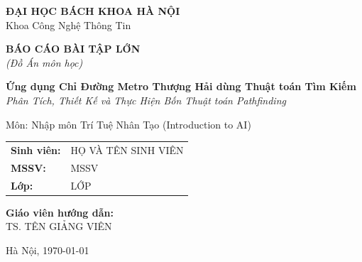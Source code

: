 
\newcommand{\svname}{HỌ VÀ TÊN SINH VIÊN}
\newcommand{\svid}{MSSV}
\newcommand{\svclass}{LỚP}
\newcommand{\gvname}{TS. TÊN GIẢNG VIÊN}
\newcommand{\reporttitle}{Ứng dụng Chỉ Đường Metro Thượng Hải dùng Thuật toán Tìm Kiếm}
\newcommand{\reportsubtitle}{Phân Tích, Thiết Kế và Thực Hiện Bốn Thuật toán Pathfinding}

\begin{titlepage}
  \centering
  \vspace*{1.5cm}
  {\Large\textbf{ĐẠI HỌC BÁCH KHOA HÀ NỘI}}\\
  \vspace{0.3cm}
  {\large Khoa Công Nghệ Thông Tin}\\
  \vspace{2cm}

  {\LARGE\textbf{BÁO CÁO BÀI TẬP LỚN}}\\
  \vspace{0.5cm}
  {\large \textit{(Đồ Án môn học)}}\\
  \vspace{2cm}

  {\huge\textbf{\reporttitle}}\\
  \vspace{0.5cm}
  {\large \textit{\reportsubtitle}}\\
  \vspace{3cm}

  {\Large Môn: Nhập môn Trí Tuệ Nhân Tạo (Introduction to AI)}\\
  \vspace{2cm}

  \begin{tabular}{ll}
    \textbf{Sinh viên:} & \svname \\
    \textbf{MSSV:} & \svid \\
    \textbf{Lớp:} & \svclass \\
  \end{tabular}
  \vspace{2cm}

  {\Large\textbf{Giáo viên hướng dẫn:}}\\
  {\Large \gvname}\\
  \vspace{3cm}

  {\Large Hà Nội, \today}
\end{titlepage}

\cleardoublepage
